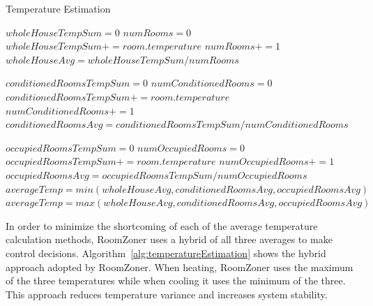 \begin{algorithm}[!htb]                      %
\caption{Temperature Estimation}          %
\label{alg:temperatureEstimation}%
\begin{algorithmic}                    %
\STATE $wholeHouseTempSum = 0$
\STATE $numRooms = 0$
\STATE $wholeHouseTempSum += room.temperature$
\STATE $numRooms += 1$
\ENDFOR
\STATE $wholeHouseAvg = wholeHouseTempSum / numRooms$

\STATE $conditionedRoomsTempSum = 0$
\STATE $numConditionedRooms = 0$
\STATE $conditionedRoomsTempSum += room.temperature$
\STATE $numConditionedRooms += 1$
\ENDIF
\ENDFOR
\STATE $conditionedRoomsAvg = conditionedRoomsTempSum / numConditionedRooms$

\STATE $occupiedRoomsTempSum = 0$
\STATE $numOccupiedRooms = 0$
\STATE $occupiedRoomsTempSum += room.temperature$
\STATE $numOccupiedRooms += 1$
\ENDIF
\ENDFOR
\STATE $occupiedRoomsAvg = occupiedRoomsTempSum / numOccupiedRooms$
\STATE $averageTemp = min(wholeHouseAvg, conditionedRoomsAvg,
occupiedRoomsAvg)$
\ELSE
\STATE $averageTemp = max(wholeHouseAvg, conditionedRoomsAvg,
occupiedRoomsAvg)$
\ENDIF
\end{algorithmic}
\end{algorithm}

In order to minimize the shortcoming of each of the average temperature
calculation methods, RoomZoner uses a hybrid of all three averages to make
control decisions. Algorithm~\ref{alg:temperatureEstimation} shows the hybrid
approach adopted by RoomZoner. When heating, RoomZoner uses the maximum of the
three temperatures while when cooling it uses the minimum of the three. This
approach reduces temperature variance and increases system stability. 


